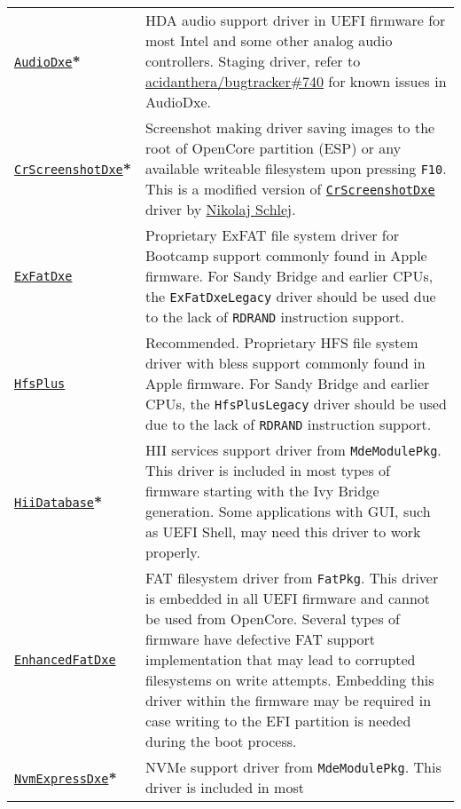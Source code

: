\documentclass[]{article}
\begin{document}
\begin{tabular}{p{1.3in}p{5.55in}}
\href{https://github.com/acidanthera/OpenCorePkg}{\texttt{AudioDxe}}\textbf{*}
& HDA audio support driver in UEFI firmware for most Intel and some other analog audio controllers.
  Staging driver, refer to \href{https://github.com/acidanthera/bugtracker/issues/740}{acidanthera/bugtracker\#740}
  for known issues in AudioDxe. \\
\href{https://github.com/acidanthera/OpenCorePkg}{\texttt{CrScreenshotDxe}}\textbf{*}
& Screenshot making driver saving images to the root of OpenCore partition (ESP) or
  any available writeable filesystem upon pressing \texttt{F10}.
  This is a modified version of \href{https://github.com/LongSoft/CrScreenshotDxe}{\texttt{CrScreenshotDxe}}
  driver by \href{https://github.com/NikolajSchlej}{Nikolaj Schlej}. \\
\href{https://github.com/acidanthera/OcBinaryData}{\texttt{ExFatDxe}}
& Proprietary ExFAT file system driver for Bootcamp support commonly found in Apple
  firmware. For Sandy Bridge and earlier CPUs, the \texttt{ExFatDxeLegacy} driver should be
  used due to the lack of \texttt{RDRAND} instruction support. \\
\href{https://github.com/acidanthera/OcBinaryData}{\texttt{HfsPlus}}
& Recommended. Proprietary HFS file system driver with bless support commonly found in Apple
  firmware. For Sandy Bridge and earlier CPUs, the \texttt{HfsPlusLegacy} driver should be
  used due to the lack of \texttt{RDRAND} instruction support. \\
\href{https://github.com/acidanthera/audk}{\texttt{HiiDatabase}}\textbf{*}
& HII services support driver from \texttt{MdeModulePkg}. This driver is included in
  most types of firmware starting with the Ivy Bridge generation. Some applications with GUI,
  such as UEFI Shell, may need this driver to work properly. \\
\href{https://github.com/acidanthera/audk}{\texttt{EnhancedFatDxe}}
& FAT filesystem driver from \texttt{FatPkg}. This driver is embedded in all
  UEFI firmware and cannot be used from OpenCore. Several types of firmware
  have defective FAT support implementation that may lead to corrupted filesystems
  on write attempts. Embedding this driver within the firmware may be required in case
  writing to the EFI partition is needed during the boot process. \\
\href{https://github.com/acidanthera/audk}{\texttt{NvmExpressDxe}}\textbf{*}
& NVMe support driver from \texttt{MdeModulePkg}. This driver is included in most

\end{tabular}
\end{document}
